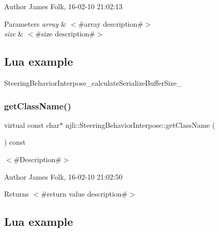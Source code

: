 \begin{DoxyAuthor}{Author}
James Folk, 16-\/02-\/10 21\+:02\+:13
\end{DoxyAuthor}

\begin{DoxyParams}{Parameters}
{\em array} & $<$\#array description\#$>$ \\
\hline
{\em size} & $<$\#size description\#$>$\\
\hline
\end{DoxyParams}
\hypertarget{classnjli_1_1_steering_behavior_wander_ex1}{}\subsection{Lua example}\label{classnjli_1_1_steering_behavior_wander_ex1}

\begin{DoxyCodeInclude}
\end{DoxyCodeInclude}
Steering\+Behavior\+Interpose\+\_\+calculate\+Serialize\+Buffer\+Size\+\_\+ \mbox{\label{classnjli_1_1_steering_behavior_interpose_aea1dd44a1ff29fae485fb554810f535d}} 
\subsubsection{\texorpdfstring{get\+Class\+Name()}{getClassName()}}
{\footnotesize\ttfamily virtual const char$\ast$ njli\+::\+Steering\+Behavior\+Interpose\+::get\+Class\+Name (\begin{DoxyParamCaption}{ }\end{DoxyParamCaption}) const\hspace{0.3cm}{\ttfamily [virtual]}}



$<$\#\+Description\#$>$ 

\begin{DoxyAuthor}{Author}
James Folk, 16-\/02-\/10 21\+:02\+:50
\end{DoxyAuthor}
\begin{DoxyReturn}{Returns}
$<$\#return value description\#$>$
\end{DoxyReturn}
\hypertarget{classnjli_1_1_steering_behavior_wander_ex1}{}\subsection{Lua example}\label{classnjli_1_1_steering_behavior_wander_ex1}

